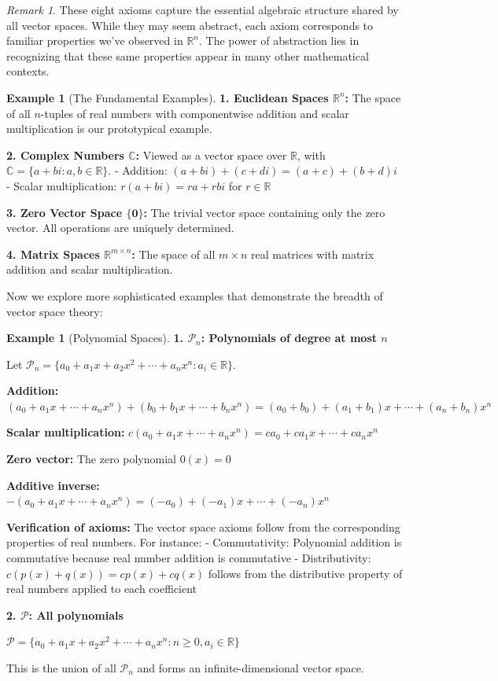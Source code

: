 \documentclass[12pt]{article}
\numberwithin{equation}{section}
\newcommand{\vect}[1]{\boldsymbol{#1}}   %
\theoremstyle{plain}
\theoremstyle{definition}
\newtheorem{example}[theorem]{Example}
\theoremstyle{remark}
\newtheorem{remark}[theorem]{Remark}
\begin{document}
\begin{remark}
These eight axioms capture the essential algebraic structure shared by all vector spaces. While they may seem abstract, each axiom corresponds to familiar properties we've observed in $\mathbb{R}^n$. The power of abstraction lies in recognizing that these same properties appear in many other mathematical contexts.
\end{remark}

\begin{example}[The Fundamental Examples]
\textbf{1. Euclidean Spaces $\mathbb{R}^n$:}
The space of all $n$-tuples of real numbers with componentwise addition and scalar multiplication is our prototypical example.

\textbf{2. Complex Numbers $\mathbb{C}$:}
Viewed as a vector space over $\mathbb{R}$, with $\mathbb{C} = \{a + bi : a, b \in \mathbb{R}\}$.
- Addition: $(a + bi) + (c + di) = (a + c) + (b + d)i$
- Scalar multiplication: $r(a + bi) = ra + rbi$ for $r \in \mathbb{R}$

\textbf{3. Zero Vector Space $\{\vect{0}\}$:}
The trivial vector space containing only the zero vector. All operations are uniquely determined.

\textbf{4. Matrix Spaces $\mathbb{R}^{m \times n}$:}
The space of all $m \times n$ real matrices with matrix addition and scalar multiplication.
\end{example}

Now we explore more sophisticated examples that demonstrate the breadth of vector space theory:

\begin{example}[Polynomial Spaces]
\textbf{1. $\mathcal{P}_n$: Polynomials of degree at most $n$}

Let $\mathcal{P}_n = \{a_0 + a_1x + a_2x^2 + \cdots + a_nx^n : a_i \in \mathbb{R}\}$.

\textbf{Addition:} $(a_0 + a_1x + \cdots + a_nx^n) + (b_0 + b_1x + \cdots + b_nx^n) = (a_0 + b_0) + (a_1 + b_1)x + \cdots + (a_n + b_n)x^n$

\textbf{Scalar multiplication:} $c(a_0 + a_1x + \cdots + a_nx^n) = ca_0 + ca_1x + \cdots + ca_nx^n$

\textbf{Zero vector:} The zero polynomial $0(x) = 0$

\textbf{Additive inverse:} $-(a_0 + a_1x + \cdots + a_nx^n) = (-a_0) + (-a_1)x + \cdots + (-a_n)x^n$

\textbf{Verification of axioms:} The vector space axioms follow from the corresponding properties of real numbers. For instance:
- Commutativity: Polynomial addition is commutative because real number addition is commutative
- Distributivity: $c(p(x) + q(x)) = cp(x) + cq(x)$ follows from the distributive property of real numbers applied to each coefficient

\textbf{2. $\mathcal{P}$: All polynomials}

$\mathcal{P} = \{a_0 + a_1x + a_2x^2 + \cdots + a_nx^n : n \geq 0, a_i \in \mathbb{R}\}$

This is the union of all $\mathcal{P}_n$ and forms an infinite-dimensional vector space.
\end{example}
\end{document}
